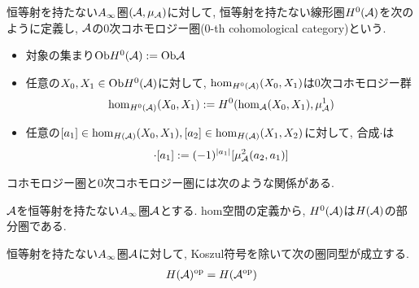 \documentclass[uplatex, a4paper, 14Q, dvipdfmx]{jsarticle}
\begin{document}
\begin{definition}[$0$次コホモロジー圏]
  恒等射を持たない$A_{\infty}$圏$(\mathcal{A},\mu_{\mathcal{A}})$に対して, 恒等射を持たない線形圏$H^0(\mathcal{A})$を次のように定義し, $\mathcal{A}$の$0$次コホモロジー圏($0$-th cohomological category)という. 
  \begin{itemize}
    \item 対象の集まり$\mathrm{Ob} H^0(\mathcal{A}) := \mathrm{Ob}\mathcal{A}$
    \item 任意の$X_0, X_1 \in \mathrm{Ob} H^0(\mathcal{A})$に対して, $\hom_{H^0(\mathcal{A})}(X_0,X_1)$は$0$次コホモロジー群
    \begin{align*}
      \hom_{H^0(\mathcal{A})}(X_0,X_1) := H^0(\hom_{\mathcal{A}}(X_0,X_1), \mu^1_{\mathcal{A}})
    \end{align*}
    \item 任意の$[a_1] \in \hom_{H(\mathcal{A})}(X_0,X_1), [a_2] \in \hom_{H(\mathcal{A})}(X_1,X_2)$に対して, 合成$\cdot$は
    \begin{align*}
      [a_2] \cdot [a_1] := (-1)^{|a_1|} [\mu^2_\A(a_2,a_1)]
    \end{align*}
  \end{itemize}
\end{definition}

コホモロジー圏と$0$次コホモロジー圏には次のような関係がある. 

\begin{remark}
  $\mathcal{A}$を恒等射を持たない$A_{\infty}$圏$\mathcal{A}$とする. 
  hom空間の定義から, $H^0(\mathcal{A})$は$H(\mathcal{A})$の部分圏である.
\end{remark}

\begin{lemma}
  恒等射を持たない$A_{\infty}$圏$\mathcal{A}$に対して, Koszul符号を除いて次の圏同型が成立する. 
  \begin{align*}
    H(\mathcal{A})^{\mathrm{op}} = H(\mathcal{A}^\mathrm{op})
  \end{align*}
\end{lemma}

\end{document}
